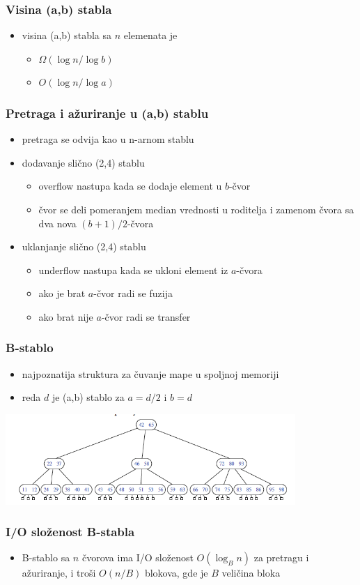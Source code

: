\documentclass[compress,aspectratio=169]{beamer}
\begin{document}
\begin{frame}[fragile]
  \frametitle{Visina (a,b) stabla}
  \begin{itemize}
    \item visina (a,b) stabla sa $n$ elemenata je
    \begin{itemize}
      \item $\Omega(\log n/\log b)$
      \item $O(\log n/\log a)$
    \end{itemize}
  \end{itemize}
\end{frame}

\begin{frame}[fragile]
  \frametitle{Pretraga i ažuriranje u (a,b) stablu}
  \begin{itemize}
    \item pretraga se odvija kao u n-arnom stablu
    \item dodavanje slično (2,4) stablu
    \begin{itemize}
      \item overflow nastupa kada se dodaje element u $b$-čvor
      \item čvor se deli pomeranjem median vrednosti u roditelja i zamenom čvora sa
      dva nova $(b+1)/2$-čvora
    \end{itemize}
    \item uklanjanje slično (2,4) stablu
    \begin{itemize}
      \item underflow nastupa kada se ukloni element iz $a$-čvora
      \item ako je brat $a$-čvor radi se fuzija
      \item ako brat nije $a$-čvor radi se transfer
    \end{itemize}
  \end{itemize}
\end{frame}

\begin{frame}[fragile]
  \frametitle{B-stablo}
  \begin{itemize}
    \item najpoznatija struktura za čuvanje mape u spoljnoj memoriji
    \item {} reda $d$ je (a,b) stablo za $a=d/2$ i $b=d$
  \end{itemize}
  \begin{center}
    \includegraphics[width=11cm]{asp-15-pic07.png}
  \end{center}
\end{frame}

\begin{frame}[fragile]
  \frametitle{I/O složenost B-stabla}
  \begin{itemize}
    \item B-stablo sa $n$ čvorova ima I/O složenost $O(\log_{B}n)$ za pretragu
    i ažuriranje, i troši $O(n/B)$ blokova, gde je $B$ veličina bloka
  \end{itemize}
\end{frame}
\end{document}
